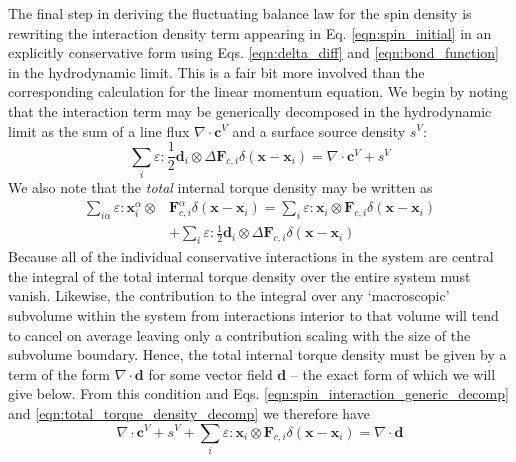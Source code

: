 \documentclass[%
 reprint,
superscriptaddress,
longbibliography,
 amsmath,amssymb,
 prl,
 citeautoscript,
]{revtex4-1}
\begin{document}
The final step in deriving the fluctuating balance law for the spin density is rewriting the interaction density term appearing in Eq. \ref{eqn:spin_initial} in an explicitly conservative form using Eqs. \ref{eqn:delta_diff} and \ref{eqn:bond_function} in the hydrodynamic limit. This is a fair bit more involved than the corresponding calculation for the linear momentum equation. We begin by noting that the interaction term may be generically decomposed in the hydrodynamic limit as the sum of a line flux $\nabla \cdot {\boldsymbol c}^V$ and a surface source density $s^V$:
\begin{equation}
\sum_i \varepsilon : \frac{1}{2} {\boldsymbol d}_i \otimes \Delta {\boldsymbol F}_{c,i} \delta \left( {\boldsymbol x} - {\boldsymbol x}_i \right) = \nabla \cdot {\boldsymbol c}^V + s^V
\label{eqn:spin_interaction_generic_decomp}
\end{equation}
We also note that the {\it total} internal torque density may be written as
\begin{equation}
\begin{split}
\sum_{i \alpha} \varepsilon : {\boldsymbol x}_i^{\alpha} \otimes &{\boldsymbol F}_{c,i}^{\alpha} \delta \left( {\boldsymbol x} - {\boldsymbol x}_i \right) = \sum_i \varepsilon : {\boldsymbol x}_i \otimes {\boldsymbol F}_{c,i} \delta \left( {\boldsymbol x} - {\boldsymbol x}_i \right) \\
&+ \sum_i \varepsilon : \frac{1}{2} {\boldsymbol d}_i \otimes \Delta {\boldsymbol F}_{c,i} \delta \left( {\boldsymbol x} - {\boldsymbol x}_i \right)
\end{split}
\label{eqn:total_torque_density_decomp}
\end{equation}
Because all of the individual conservative interactions in the system are central the integral of the total internal torque density over the entire system must vanish. Likewise, the contribution to the integral over any `macroscopic' subvolume within the system from interactions interior to that volume will tend to cancel on average leaving only a contribution scaling with the size of the subvolume boundary. Hence, the total internal torque density must be given by a term of the form $\nabla \cdot {\boldsymbol d}$ for some vector field ${\boldsymbol d}$ -- the exact form of which we will give below. From this condition and Eqs. \ref{eqn:spin_interaction_generic_decomp} and \ref{eqn:total_torque_density_decomp} we therefore have
\begin{equation}
\nabla \cdot {\boldsymbol c}^V + s^V + \sum_i \varepsilon : {\boldsymbol x}_i \otimes {\boldsymbol F}_{c,i} \delta \left( {\boldsymbol x} - {\boldsymbol x}_i \right) = \nabla \cdot {\boldsymbol d}
\label{eqn:spin_decomp_2}
\end{equation}
\end{document}
